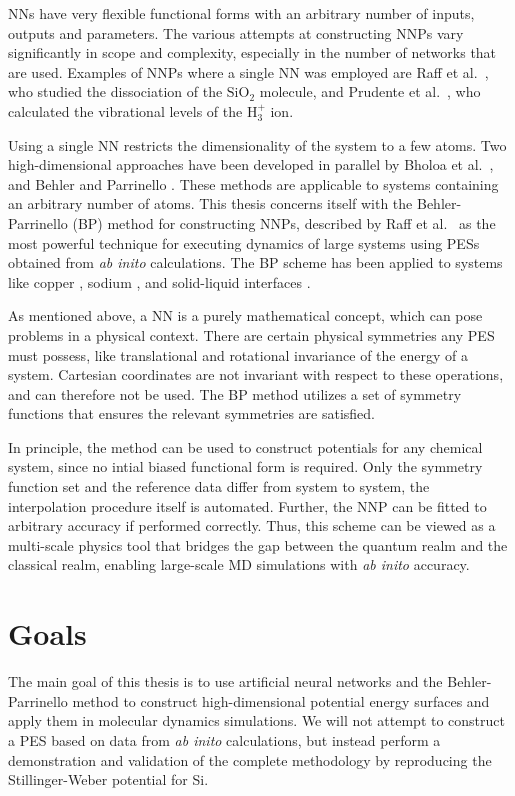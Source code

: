 \documentclass[twoside,english]{uiofysmaster}
\begin{document}
NNs have very flexible 
functional forms with an arbitrary number of inputs, outputs and parameters.
The various attempts at constructing NNPs vary significantly in scope and complexity, especially in the number of networks that are used.
Examples of NNPs where a single NN was employed are Raff et al.\ \cite{Agrawal06}, who studied the dissociation of 
the $\mathrm{SiO}_2$ molecule, and Prudente et al.\ \cite{Prudente98}, who calculated the vibrational levels of the $\mathrm{H}_3^+$ ion. 

Using a single NN restricts the dimensionality of the system to a few atoms. Two high-dimensional approaches have 
been developed in parallel by Bholoa et al.\ \cite{Bholoa07}, and Behler and Parrinello \cite{Behler11symmetry}. These 
methods are applicable to systems containing an arbitrary number of atoms. 
This thesis concerns itself with the Behler-Parrinello (BP) method for constructing NNPs, described by Raff et al.\ \cite{Raff12}
as the most powerful technique for executing dynamics of large systems using PESs obtained from \textit{ab inito} 
calculations. The BP scheme has been applied to systems like copper \cite{Artrith12}, sodium \cite{Eshet12}, and solid-liquid 
interfaces \cite{Natarajan16}. 

As mentioned above, a NN is a purely mathematical concept, which can pose problems in a physical context. 
There are certain physical symmetries any PES must possess, like translational and rotational invariance
of the energy of a system. Cartesian coordinates are not invariant with respect to these operations, and can therefore not 
be used. The BP method utilizes a set of symmetry functions that ensures the relevant symmetries are satisfied. 

In principle, the method can be used to construct potentials for any chemical system, since no intial biased functional form 
is required. Only the symmetry function set and the reference data differ from system to system, the interpolation procedure itself 
is automated. Further, the NNP can be fitted to arbitrary accuracy if performed correctly. 
Thus, this scheme can be viewed as a multi-scale physics tool that bridges the gap between the 
quantum realm and the classical realm, enabling large-scale MD simulations with \textit{ab inito} accuracy.


\section{Goals}
The main goal of this thesis is to use artificial neural networks and the Behler-Parrinello method to
construct high-dimensional potential energy surfaces and apply them in molecular dynamics simulations.
We will not attempt to construct a PES based on data from \textit{ab inito} calculations, but instead 
perform a demonstration and validation of the complete methodology by reproducing the Stillinger-Weber potential for Si. 
\end{document}
